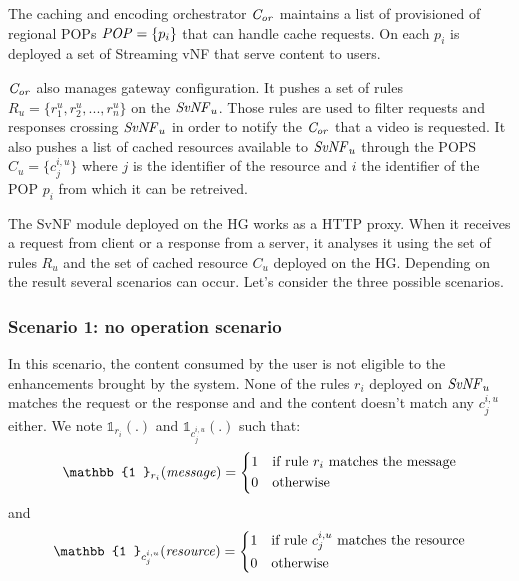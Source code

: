 The caching and encoding orchestrator  $\mathit{C_{or}}$ maintains a list of provisioned of regional POPs \(\mathit{POP}=\{p_{i}\}\) that can handle cache requests. On each $p_{i}$ is deployed a set of Streaming vNF that serve content to users.

$\mathit{C_{or}}$ also manages gateway configuration. It pushes a set of rules \(R_{u}=\{r^{u}_{1},r^{u}_{2},...,r^{u}_{n}\}\) on the $\mathit{SvNF}_{u}$. 
Those rules are used to filter requests and responses crossing $\mathit{SvNF}_{u}$ in order to notify the $\mathit{C_{or}}$ that a video is requested.
It also pushes a list of cached resources available to $\mathit{SvNF}_{u}$ through the POPS $C_{u}=\{c^{i,u}_{j} \}$ where $j$ is the identifier of the resource and $i$ the identifier of the POP $p_{i}$ from which it can be retreived.

The SvNF module deployed on the HG works as a HTTP proxy.
When it receives a request from client or a response from a server, it analyses it using the set of rules \(R_{u}\) and the set of cached resource $C_{u}$ deployed on the HG.
Depending on the result several scenarios can occur.
Let's consider the three possible scenarios.


\subsubsection*{Scenario 1: no operation scenario}

In this scenario, the content consumed by the user is not eligible to the enhancements brought by the system. None of the rules $r_{i}$ deployed on $\mathit{SvNF}_{u}$ matches the request or the response and and the content doesn't match any $c^{i,u}_{j}$ either. We note $\mathbb{1}_{r_{i}}(.)$ and $\mathbb{1}_{c^{i,u}_{j}}(.)$ such that:
\[
    \mathbb{1 }_{r_{i}}(\mathit{message})= 
\begin{dcases}
    1& \text{if rule $r_{i}$ matches the message} \\
    0              & \text{otherwise}
\end{dcases}
\]
and 
\[
    \mathbb{1 }_{c^{i,u}_{j}}(\mathit{resource})= 
\begin{dcases}
    1& \text{if rule $c^{i,u}_{j}$ matches the resource} \\
    0              & \text{otherwise}
\end{dcases}
\]

